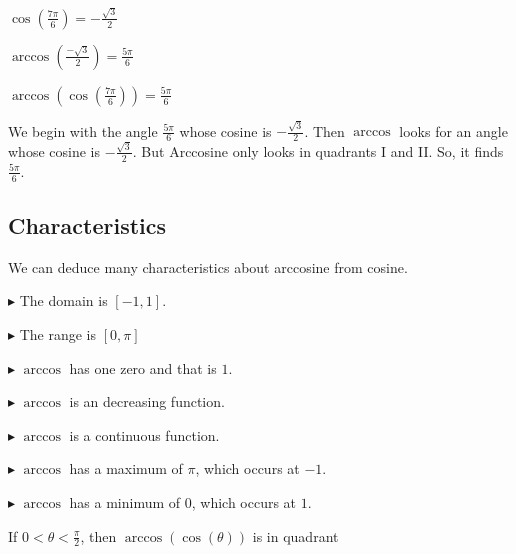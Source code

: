 \documentclass{ximera}
\begin{document}
\begin{example}



$\cos\left(\frac{7\pi}{6}\right) = -\frac{\sqrt{3}}{2}$

$\arccos\left(\frac{-\sqrt{3}}{2}\right) = \frac{5\pi}{6}$


$\arccos\left(\cos\left(\frac{7\pi}{6}\right)\right) = \frac{5\pi}{6}$




We begin with the angle $\frac{5\pi}{6}$ whose cosine is $-\frac{\sqrt{3}}{2}$.  Then $\arccos$ looks for an angle whose cosine is $-\frac{\sqrt{3}}{2}$.  But Arccosine only looks in quadrants I and II.  So, it finds $\frac{5\pi}{6}$.


\end{example}











\subsection*{Characteristics} 

We can deduce many characteristics about arccosine from cosine.


$\blacktriangleright$ The domain is  $[-1, 1]$.


$\blacktriangleright$ The range is $[0, \pi]$


$\blacktriangleright$ $\arccos$ has one zero and that is $1$.


$\blacktriangleright$ $\arccos$ is an decreasing function.

$\blacktriangleright$ $\arccos$ is a continuous function.

$\blacktriangleright$ $\arccos$ has a maximum of $\pi$, which occurs at $-1$.

$\blacktriangleright$ $\arccos$ has a minimum of $0$, which occurs at $1$.








\begin{question}


If $0 < \theta < \frac{\pi}{2}$, then $\arccos(\cos(\theta))$ is in quadrant

\begin{multipleChoice}
\end{multipleChoice}

\end{question}
\end{document}
